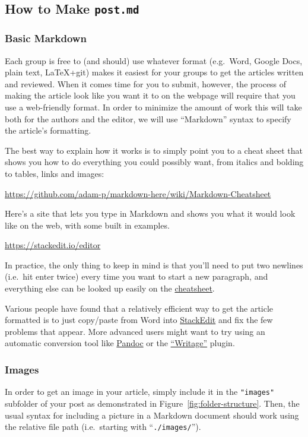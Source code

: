 \documentclass[paper=a4, fontsize=11pt]{scrartcl}
\numberwithin{equation}{section}        %
\numberwithin{figure}{section}            %
\numberwithin{table}{section}                %
\begin{document}
\subsection{How to Make \texttt{\textbf{post.md}}}\label{sec:markdown}

\subsubsection{Basic Markdown}

Each group is free to (and should) use whatever format (e.g.\ Word, Google Docs, plain text,
LaTeX+git) makes it easiest for your groups to get the articles written and
reviewed. When it comes time for you to submit, however, the process of making
the article look like you want it to on the webpage will require that you use a web-friendly
format. In order to minimize the amount of work this will take both for the
authors and the editor, we will use ``Markdown'' syntax to specify the article's
formatting.

The best way to explain how it works is to simply point you to a cheat
sheet that shows you how to do everything you could possibly want,
from italics and bolding to tables, links and images:

\url{https://github.com/adam-p/markdown-here/wiki/Markdown-Cheatsheet}

Here's a site that lets you type in Markdown and shows you what it would
look like on the web, with some built in examples.

\url{https://stackedit.io/editor}

In practice, the only thing to keep in mind is that you'll need to put
two newlines (i.e.\ hit enter twice) every time you want to start a new
paragraph, and everything else can be looked up easily on the
\href{https://github.com/adam-p/markdown-here/wiki/Markdown-Cheatsheet}{cheatsheet}.

Various people have found
that a relatively efficient way to get the article formatted is to just copy/paste
from Word into \href{https://stackedit.io/editor}{StackEdit} and fix the few problems that appear. More advanced users
might want to try using an automatic conversion tool like
\href{http://pandoc.org/demos.html}{Pandoc} or the
\href{http://www.writage.com/}{``Writage''} plugin.

\subsubsection{Images}\label{sec:image-links}
In order to get an image in your article, simply include it in the
\texttt{"images"} subfolder of your post as demonstrated in
Figure~\ref{fig:folder-structure}. Then, the usual syntax for including a
picture in a Markdown document should work using the relative file path
(i.e.\ starting with ``\texttt{./images/}'').
\end{document}
